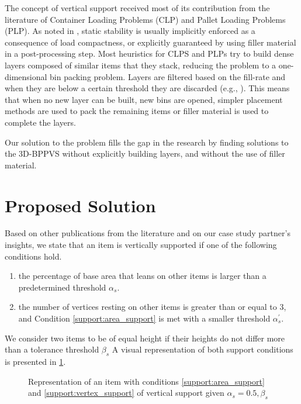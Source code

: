 \documentclass[11pt,a4paper,twocolumn]{article}
\begin{document}
The concept of vertical support received most of its contribution from the literature of Container Loading Problems (CLP) and Pallet Loading Problems (PLP).
As noted in \cite{BORTFELDT20131}, static stability is usually implicitly enforced as a consequence of load compactness, or explicitly guaranteed by using filler material in a post-processing step.
Most heuristics for CLPS and PLPs try to build dense layers composed of similar items that they stack, reducing the problem to a one-dimensional bin packing problem.
Layers are filtered based on the fill-rate and when they are below a certain threshold they are discarded (e.g., \cite{elhedhli2019three, Alonso2020}).
This means that when no new layer can be built, new bins are opened, simpler placement methods are used to pack the remaining items or filler material is used to complete the layers.

Our solution to the problem fills the gap in the research by finding solutions to the 3D-BPPVS without explicitly building layers, and without the use of filler material.

\section{Proposed Solution}

Based on other publications from the literature and on our case study partner's insights, we state that an item is vertically supported if one of the following conditions hold.

\begin{enumerate}[label={\textbf{Condition \arabic*}.},ref={\arabic*},leftmargin=*]
    \item the percentage of base area that leans on other items is larger than a predetermined threshold $\alpha_s$. \label{support:area_support}
    \item the number of vertices resting on other items is greater than or equal to 3, and Condition \ref{support:area_support} is met with a smaller threshold $\alpha^\prime_s$. \label{support:vertex_support}
\end{enumerate}
We consider two items to be of equal height if their heights do not differ more than a tolerance threshold $\beta_s$
A visual representation of both support conditions is presented in \cref{fig:support}.

\begin{figure}[h]
    \resizebox{\columnwidth}{!}{%
    
    }
    \caption{Representation of an item with conditions \ref{support:area_support} and \ref{support:vertex_support} of vertical support given $\alpha_s = 0.5, \beta_s$}
    \label{fig:support}
\end{figure}
\end{document}
